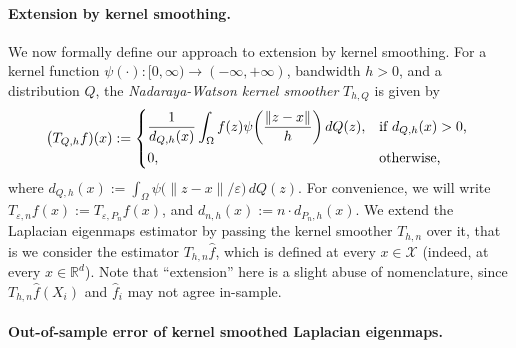 \documentclass{article}
\newcommand{\Reals}{\mathbb{R}}
\newcommand{\1}{\mathbf{1}}
\newcommand{\Rd}{\Reals^d}
\newcommand{\mc}[1]{\mathcal{#1}}
\newcommand{\wh}[1]{\widehat{#1}}
\theoremstyle{alden}
\theoremstyle{aldenthm}
\theoremstyle{definition}
\theoremstyle{remark}
\begin{document}
\paragraph{Extension by kernel smoothing.}
We now formally define our approach to extension by kernel smoothing. For a kernel function $\psi(\cdot): [0,\infty) \to (-\infty,+\infty)$, bandwidth $h > 0$, and a distribution $Q$, the \emph{Nadaraya-Watson kernel smoother} $T_{h,Q}$ is given by
\begin{equation*}
\bigl(T_{Q,h}f)(x) := 
\begin{dcases*}
\frac{1}{d_{Q,h}(x)} \int_{\Omega} f(z)\psi\biggl(\frac{\|z - x\|}{h}\biggr) \,dQ(z), & \textrm{if $d_{Q,h}(x) > 0$,} \\
0, &\textrm{otherwise,}
\end{dcases*}
\end{equation*}
where $d_{Q,h}(x) := \int_{\Omega} \psi\bigl(\|z - x\|/\varepsilon\bigr) \,dQ(z)$. For convenience, we will write $T_{\varepsilon,n}f(x) := T_{\varepsilon,P_n}f(x)$, and $d_{n,h}(x) := n \cdot d_{P_n,h}(x)$.  We extend the Laplacian eigenmaps estimator by passing the kernel smoother $T_{h,n}$ over it, that is we consider the estimator $T_{h,n}\wh{f}$, which is defined at every $x \in \mc{X}$ (indeed, at every $x \in \Rd$). Note that ``extension'' here is a slight abuse of nomenclature, since $T_{h,n}\wh{f}(X_i)$ and $\wh{f}_i$ may not agree in-sample.

\paragraph{Out-of-sample error of kernel smoothed Laplacian eigenmaps.}
\end{document}
